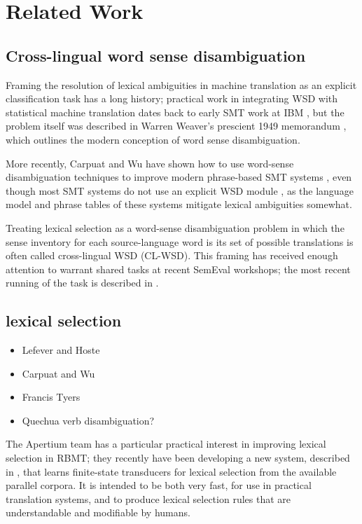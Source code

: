 \section{Related Work}

\subsection{Cross-lingual word sense disambiguation}

Framing the resolution of lexical ambiguities in machine translation as an
explicit classification task has a long history; practical work in integrating
WSD with statistical machine translation dates back to early SMT work at IBM
\cite{Brown91word-sensedisambiguation}, but the problem itself was described in
Warren Weaver's prescient 1949 memorandum \cite{weavermemo}, which outlines the
modern conception of word sense disambiguation.

More recently, Carpuat and Wu have shown how to use word-sense disambiguation
techniques to improve modern phrase-based SMT systems \cite{carpuatpsd}, even
though most SMT systems do not use an explicit WSD module \cite{wsdchap3}, as
the language model and phrase tables of these systems mitigate lexical
ambiguities somewhat.

Treating lexical selection as a word-sense disambiguation problem in which the
sense inventory for each source-language word is its set of possible
translations is often called cross-lingual WSD (CL-WSD). This framing has
received enough attention to warrant shared tasks at recent SemEval workshops;
the most recent running of the task is described in \cite{task10}.

\subsection{lexical selection}


\cite{carpuat2008evaluation}

\cite{carpuat-wu:2007:EMNLP-CoNLL2007}

\begin{itemize}
  \item Lefever and Hoste
  \item Carpuat and Wu
  \item Francis Tyers \cite{tyers-fst}
  \item Quechua verb disambiguation?
\end{itemize}


The Apertium team has a particular practical interest in improving lexical
selection in RBMT; they recently have been developing
a new system, described in \cite{tyers-fst}, that learns finite-state
transducers for lexical selection from the available parallel corpora. It is
intended to be both very fast, for use in practical translation systems, and
to produce lexical selection rules that are understandable and modifiable by
humans.

